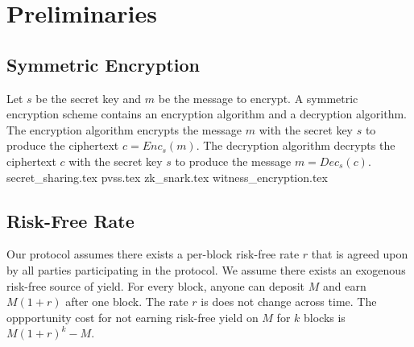 \section{Preliminaries}
    \subsection{Symmetric Encryption}
    Let $s$ be the secret key and $m$ be the message to encrypt.
    A symmetric encryption scheme contains an encryption algorithm and a decryption algorithm.
    The encryption algorithm encrypts the message $m$ with the secret key $s$ to produce the ciphertext $c = Enc_s(m)$.
    The decryption algorithm decrypts the ciphertext $c$ with the secret key $s$ to produce the message $m = Dec_s(c)$.
    {secret_sharing.tex}
    {pvss.tex}
    {zk_snark.tex}
    {witness_encryption.tex}
    \subsection{Risk-Free Rate}
    Our protocol assumes there exists a per-block risk-free rate $r$ that is agreed upon by all parties participating in the protocol.
    We assume there exists an exogenous risk-free source of yield.
    For every block, anyone can deposit $M$ and earn $M(1 + r)$ after one block.
    The rate $r$ is does not change across time.
    The oppportunity cost for not earning risk-free yield on $M$ for $k$ blocks is $M(1 + r)^k - M$.

